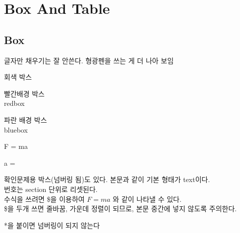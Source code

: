 \section
{Box And Table}

\subsection{Box}
%
글자만  채우기는 잘 안쓴다. 형광펜을 쓰는 게 더 나아 보임\\
\begin{graybox}
회색 박스
\end{graybox}

\begin{redbox}
빨간배경 박스 \\
redbox
\end{redbox}

\begin{bluebox}
파란 배경 박스 \\
bluebox
\end{bluebox}

\begin{eqbox}
F = ma ~~~~~ 
\end{eqbox}
\vspace{10pt}%

\begin{eqbox}
a =  ~~~~~ 
\end{eqbox}
\vspace{10pt}%

\begin{checkbox}
확인문제용 박스(넘버링 됨)도 있다. 본문과 같이 기본 형태가 text이다. \\
번호는 section 단위로 리셋된다. \\
수식을 쓰려면 \$을 이용하여 $F=ma$ 와 같이 나타낼 수 있다. \\
\$을 두개 쓰면 줄바꿈, 가운데 정렬이 되므로, 본문 중간에 넣지 않도록 주의한다.
\end{checkbox}

\begin{checkbox*}
*을 붙이면 넘버링이 되지 않는다
\end{checkbox*}

